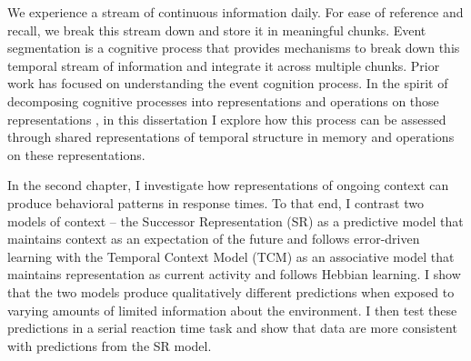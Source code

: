 We experience a stream of continuous information daily. For ease of reference and recall, we break this stream down and store it in meaningful chunks. Event segmentation is a cognitive process that provides mechanisms to break down this temporal stream of information and integrate it across multiple chunks. Prior work has focused on understanding the event cognition process. In the spirit of decomposing cognitive processes into representations and operations on those representations \parencite{cowell2019roadmap}, in this dissertation I explore how this process can be assessed through shared representations of temporal structure in memory and operations on these representations. 

In the second chapter, I investigate how representations of ongoing context can produce behavioral patterns in response times. To that end, I contrast two models of context -- the Successor Representation (SR) as a predictive model that maintains context as an expectation of the future and follows error-driven learning with the Temporal Context Model (TCM) as an associative model that maintains representation as current activity and follows Hebbian learning. I show that the two models produce qualitatively different predictions when exposed to varying amounts of limited information about the environment. I then test these predictions in a serial reaction time task and show that data are more consistent with predictions from the SR model.


